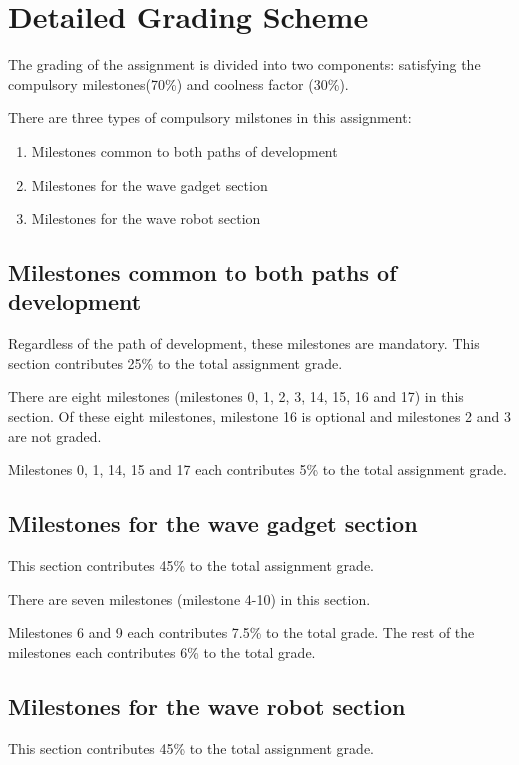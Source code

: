 \section{Detailed Grading Scheme}

The grading of the assignment is divided into two components:
satisfying the compulsory milestones(70\%) and coolness factor
(30\%). 

There are three types of compulsory milstones in this assignment:
\begin{enumerate}
    \item Milestones common to both paths of development
    \item Milestones for the wave gadget section
    \item Milestones for the wave robot section
\end{enumerate} 

\subsection{Milestones common to both paths of development}

Regardless of the path of development, these milestones are
mandatory. This section contributes 25\% to the total assignment
grade.

There are eight milestones (milestones 0, 1, 2, 3, 14, 15, 16 and 17)
in this section. Of these eight milestones, milestone 16 is optional
and milestones 2 and 3 are not graded.

Milestones 0, 1, 14, 15 and 17 each contributes 5\% to the total
assignment grade.

\subsection{Milestones for the wave gadget section}

This section contributes 45\% to the total assignment grade.

There are seven milestones (milestone 4-10) in this section.

Milestones 6 and 9 each contributes 7.5\% to the total grade.  The
rest of the milestones each contributes 6\% to the total grade.

\subsection{Milestones  for the wave robot section}
This section contributes 45\% to the total assignment grade.

